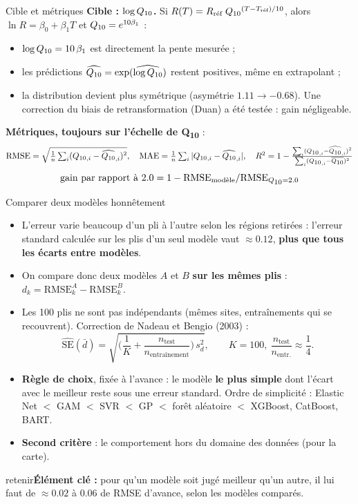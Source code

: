\documentclass[aspectratio=169,10pt]{beamer}
\newcommand{\retenir}[1]{\vfill\begin{beamercolorbox}[sep=5pt,rounded=true]{retenir}\small\textbf{Élément clé :} #1\end{beamercolorbox}}
\newcommand{\Qdix}{Q\textsubscript{10}}
\begin{document}
\begin{frame}{Cible et métriques}
  \small
  \textbf{Cible : $\log\Qdix$.} Si $R(T) = R_{\text{réf}}\;\Qdix^{(T-T_{\text{réf}})/10}$, alors $\ln R = \beta_0 + \beta_1 T$ et $\Qdix = e^{10\beta_1}$ :
  \begin{itemize}
    \item $\log\Qdix = 10\,\beta_1$ est directement la pente mesurée ;
    \item les prédictions $\widehat{\Qdix} = \exp(\widehat{\log\Qdix})$ restent positives, même en extrapolant ;
    \item la distribution devient plus symétrique (asymétrie $1.11 \to -0.68$). Une correction du biais de retransformation (Duan) a été testée : gain négligeable.
  \end{itemize}
  \textbf{Métriques, toujours sur l'échelle de \Qdix{}} :
  \[ \text{RMSE}=\sqrt{\tfrac1n\textstyle\sum_i(\Qdix_{,i}-\widehat{\Qdix}_{,i})^2},\quad \text{MAE}=\tfrac1n\textstyle\sum_i|\Qdix_{,i}-\widehat{\Qdix}_{,i}|,\quad R^2 = 1-\frac{\sum_i(\Qdix_{,i}-\widehat{\Qdix}_{,i})^2}{\sum_i(\Qdix_{,i}-\overline{\Qdix})^2} \]
  \[ \text{gain par rapport à 2.0} = 1 - \text{RMSE}_{\text{modèle}} / \text{RMSE}_{\Qdix=2.0} \]
\end{frame}

\begin{frame}{Comparer deux modèles honnêtement}
  \small
  \begin{itemize}
    \item L'erreur varie beaucoup d'un pli à l'autre selon les régions retirées : l'erreur standard calculée sur les plis d'un seul modèle vaut $\approx 0.12$, \textbf{plus que tous les écarts entre modèles}.
    \item On compare donc deux modèles $A$ et $B$ \textbf{sur les mêmes plis} : $d_k = \text{RMSE}^A_k - \text{RMSE}^B_k$.
    \item Les 100 plis ne sont pas indépendants (mêmes sites, entraînements qui se recouvrent). Correction de Nadeau et Bengio (2003) :
    \[ \widehat{\mathrm{SE}}(\bar d) = \sqrt{\Big(\frac{1}{K} + \frac{n_{\text{test}}}{n_{\text{entraînement}}}\Big)\, s_d^2}, \qquad K=100,\ \frac{n_{\text{test}}}{n_{\text{entr.}}}\approx\frac14 . \]
    \item \textbf{Règle de choix}, fixée à l'avance : le modèle \textbf{le plus simple} dont l'écart avec le meilleur reste sous une erreur standard. Ordre de simplicité : Elastic Net $<$ GAM $<$ SVR $<$ GP $<$ forêt aléatoire $<$ XGBoost, CatBoost, BART.
    \item \textbf{Second critère} : le comportement hors du domaine des données (pour la carte).
  \end{itemize}
  \retenir{pour qu'un modèle soit jugé meilleur qu'un autre, il lui faut de $\approx 0.02$ à $0.06$ de RMSE d'avance, selon les modèles comparés.}
\end{frame}
\end{document}
